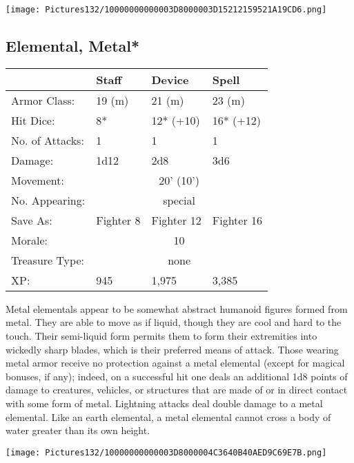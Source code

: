 \documentclass[a4paper,twoside,openany,10pt]{book}
\begin{document}
\begin{multicols}{2}
\begin{center}
	\texttt{[image: Pictures132/10000000000003D8000003D15212159521A19CD6.png]}
\end{center}


\subsection*{Elemental, Metal*}\label{elemental-metal}

\begin{tabularx}{0.48\textwidth}{@{}lllX@{}}
& Staff & Device & Spell \\\hline
Armor Class: & 19 (m) & 21 (m) & 23 (m) \\\hline
Hit Dice: & 8* & 12* (+10) & 16* (+12) \\\hline
No. of Attacks: & 1 & 1 & 1 \\\hline
Damage: & 1d12 & 2d8 & 3d6 \\\hline
Movement:  & \multicolumn{3}{c}{20' (10')}\\\hline
No. Appearing: &\multicolumn{3}{c}{special} \\\hline
Save As: & Fighter 8 & Fighter 12 & Fighter 16 \\\hline
Morale: & \multicolumn{3}{c}{10} \\\hline
Treasure Type: & \multicolumn{3}{c}{none} \\\hline
XP: & 945 & 1,975 & 3,385 \\\hline
\end{tabularx}\medskip

Metal elementals appear to be somewhat abstract humanoid figures formed from metal. They are able to move as if liquid, though they are cool and hard to the touch. Their semi-liquid form permits them to form their extremities into wickedly sharp blades, which is their preferred means of attack. Those wearing metal armor receive no protection against a metal elemental (except for magical bonuses, if any); indeed, on a successful hit one deals an additional 1d8 points of damage to creatures, vehicles, or structures that are made of or in direct contact with some form of metal. Lightning attacks deal double damage to a metal elemental. Like an earth elemental, a metal elemental cannot cross a body of water greater than its own height.

\begin{center}
	\texttt{[image: Pictures132/10000000000003D8000004C3640B40AED9C69E7B.png]}
\end{center}


\end{multicols}
\end{document}
